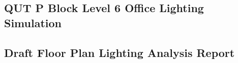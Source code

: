 \subsection{QUT P Block Level 6 Office Lighting Simulation}
\label{appendix:QUT-Lvl6-office-rev3}



\subsection{Draft Floor Plan Lighting Analysis Report}
\label{appenddix:DraftFloorPlanLighting}



